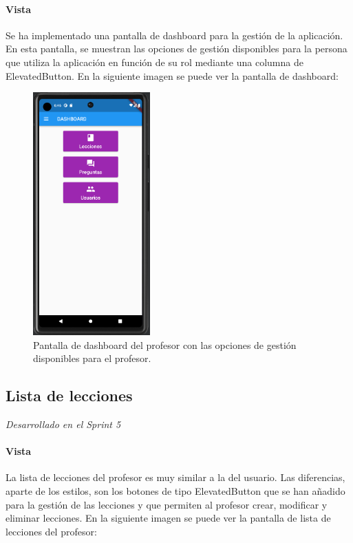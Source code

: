 \paragraph*{Vista}
Se ha implementado una pantalla de dashboard para la gestión de la aplicación. En esta pantalla, se muestran las opciones de gestión disponibles para la persona que utiliza la aplicación en función de su rol mediante una columna de ElevatedButton. En la siguiente imagen se puede ver la pantalla de dashboard:

\begin{figure}[H]
  \centering
  \includegraphics[width=0.4\textwidth]{imagenes/c7/dashboard.png}
  \caption{Pantalla de dashboard del profesor con las opciones de gestión disponibles para el profesor.}
  \label{fig:login}
\end{figure}


\subsection{Lista de lecciones} 
\textit{Desarrollado en el Sprint 5}

\paragraph*{Vista}
La lista de lecciones del profesor es muy similar a la del usuario. Las diferencias, aparte de los estilos, son los botones de tipo ElevatedButton que se han añadido para la gestión de las lecciones y que permiten al profesor crear, modificar y eliminar lecciones. En la siguiente imagen se puede ver la pantalla de lista de lecciones del profesor:

